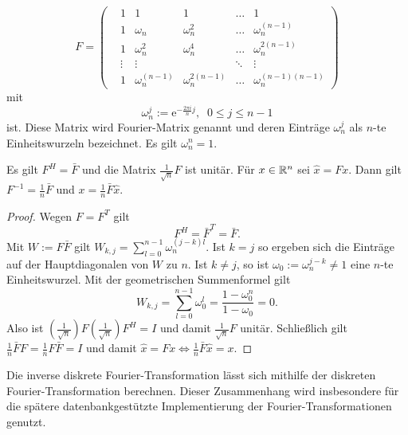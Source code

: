 \begin{equation}
    \label{eq:FM}
    F=\begin{pmatrix}
        &1 &1 &1 &\ldots &1 \\
        &1 &\omega_n &\omega_n^2 &\ldots &\omega_n^{(n-1)} \\
        &1 &\omega_n^2 &\omega_n^4 &\ldots &\omega_n^{2 (n-1)} \\
        &\vdots &\vdots & &\ddots &\vdots \\
        &1 &\omega_n^{(n-1)} &\omega_n^{2(n-1)}  &\ldots &\omega_n^{(n-1)(n-1)}
    \end{pmatrix}
\end{equation}
mit 
\begin{equation*}
    \omega_n^{j}:=\mathrm{e}^{- \frac{2 \pi i}{n} j}, \; \; 0 \leq j \leq n-1
\end{equation*}
ist. Diese Matrix wird Fourier-Matrix genannt und deren Einträge $\omega_n^{j}$ als $n$-te Einheitswurzeln bezeichnet. Es gilt $\omega_n^n=1$.
\begin{lem}
    \label{lem:Finv}
    Es gilt $F^H=\bar{F}$ und die Matrix $\frac{1}{\sqrt{n}} F$ ist unitär. Für $x \in \mathbb{R}^n$ sei $\hat{x}=Fx$. Dann gilt $F^{-1}=\frac{1}{n} \bar{F}$ und $x= \frac{1}{n}\bar{F} \hat{x}$.
\end{lem}
\begin{proof}
    Wegen $F=F^T$ gilt 
    \begin{equation*}
        F^H=\bar{{F}}^T=\bar{F}.
    \end{equation*}
    Mit $W:=F\bar{F}$ gilt $W_{k,j}=\sum_{l=0}^{n-1} \omega_n^{(j-k)l}$. Ist $k=j$ so ergeben sich die Einträge auf der Hauptdiagonalen von $W$ zu $n$. Ist $k \neq j$, so ist $\omega_0:=\omega_n^{j-k} \neq 1$ eine $n$-te Einheitswurzel.
    Mit der geometrischen Summenformel gilt
    \begin{equation*}
        W_{k,j}=\sum_{l=0}^{n-1} \omega_0^l=\frac{1-\omega_0^n}{1-\omega_0}=0.
    \end{equation*} 
    Also ist $\left(\frac{1}{\sqrt{n}}\right) F\left(\frac{1}{\sqrt{n}}\right) F^H=I$ und damit $\frac{1}{\sqrt{n}} F$ unitär. Schließlich gilt $\frac{1}{n} \bar{F} F=\frac{1}{n} F \bar{F}= I$ und damit $\hat{x}=Fx \Leftrightarrow \frac{1}{n}\bar{F} \hat{x}=x$.
\end{proof} 
Die inverse diskrete Fourier-Transformation lässt sich mithilfe der diskreten Fourier-Transformation berechnen. Dieser Zusammenhang wird insbesondere für die spätere datenbankgestützte Implementierung der Fourier-Transformationen genutzt.
